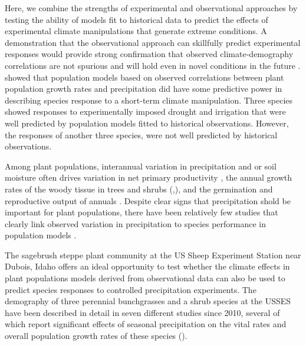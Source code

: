 \documentclass[11pt]{article}
\begin{document}
\begin{doublespace}
Here, we combine the strengths of experimental and observational approaches by testing the ability of models fit to historical data to predict the effects of experimental climate manipulations that generate extreme conditions. A demonstration that the observational approach can skillfully predict experimental responses would provide strong confirmation that observed climate-demography correlations are not spurious and will hold even in novel conditions in the future \cite{adler_can_2013}. \citep{adler_can_2013} showed that population models based on observed correlations between plant population growth rates and precipitation did have some predictive power in describing species response to a short-term climate manipulation. Three species showed responses to experimentally imposed drought and irrigation that were well predicted by population models fitted to historical observations.  However, the responses of another three species, were not well predicted by historical observations. 

Among plant populations, interannual variation in precipitation and or soil moisture often drives variation in net primary productivity \citep{knapp_variation_2001,hsu_anticipating_2014}, the annual growth rates of the woody tissue in trees and shrubs (\citep{yang_3500-year_2014},\citep{srur_annual_2009,franklin_growth_2013}), and the germination and reproductive output of annuals \citep{venable_bet_2007}. Despite clear signs that precipitation shold be important for plant populations, there have been relatively few studies that clearly link observed variation in precipitation to species performance in population models \citep{ehrlen_advancing_2016}.   

The sagebrush steppe plant community at the US Sheep Experiment Station near Dubois, Idaho offers an ideal opportunity to test whether the climate effects in plant populations models derived from observational data can also be used to predict species responses to controlled precipitation experiments. The demography of three perennial bunchgrasses and a shrub species at the USSES have been described in detail in seven different studies since 2010, several of which report significant effects of seasonal precipitation on the vital rates and overall population growth rates of these species (\citep{adler_coexistence_2010,adler_forecasting_2012,adler_weak_2009,adler_weak_2016,chu_direct_2016,chu_large_2015,dalgleish_climate_2010}).


\end{doublespace}
\end{document}

